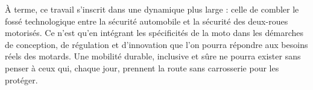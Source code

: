 À terme, ce travail s’inscrit dans une dynamique plus large : celle de combler le fossé technologique entre la sécurité automobile et la sécurité des deux-roues motorisés. Ce n’est qu’en intégrant les spécificités de la moto dans les démarches de conception, de régulation et d’innovation que l’on pourra répondre aux besoins réels des motards. Une mobilité durable, inclusive et sûre ne pourra exister sans penser à ceux qui, chaque jour, prennent la route sans carrosserie pour les protéger.